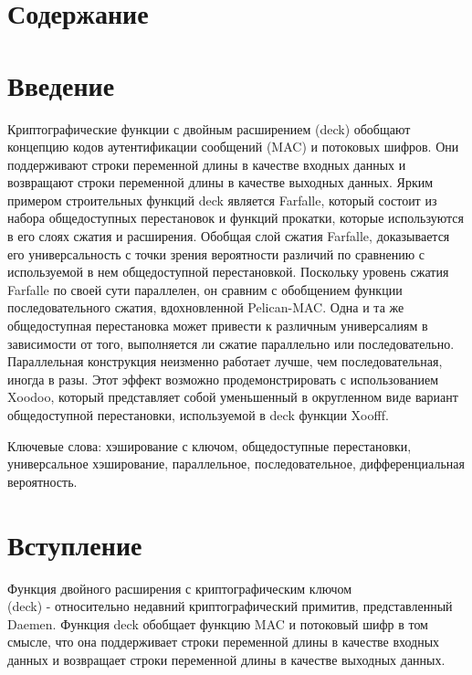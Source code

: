 \documentclass[utf8,14pt,a4paper,oneside,russian]{book}
\makeatletter
\renewcommand{\tableofcontents}{\section*{Содержание}\markboth{Содержание}{}\@starttoc{toc}\newpage}
\makeatother
\begin{document}
\tableofcontents

\newpage
\section{Введение}
Криптографические функции с двойным расширением (deck) обобщают концепцию 
кодов аутентификации сообщений (MAC) и потоковых шифров. Они поддерживают 
строки переменной длины в качестве входных данных и возвращают строки 
переменной длины в качестве выходных данных. Ярким примером строительных 
функций deck является Farfalle, который состоит из набора общедоступных 
перестановок и функций прокатки, которые используются в его слоях сжатия 
и расширения. Обобщая слой сжатия Farfalle, доказывается его универсальность 
с точки зрения вероятности различий по сравнению с используемой в нем общедоступной 
перестановкой. Поскольку уровень сжатия Farfalle по своей сути параллелен, 
он сравним с обобщением функции последовательного сжатия, вдохновленной 
Pelican-MAC. Одна и та же общедоступная перестановка может привести к 
различным универсалиям в зависимости от того, выполняется ли сжатие 
параллельно или последовательно. Параллельная конструкция неизменно работает 
лучше, чем последовательная, иногда в разы. Этот эффект возможно продемонстрировать с 
использованием Xoodoo, который представляет собой уменьшенный в округленном виде 
вариант общедоступной перестановки, используемой в deck функции Xoofff.

Ключевые слова: хэширование с ключом, общедоступные перестановки, 
универсальное хэширование, параллельное, последовательное, дифференциальная 
вероятность.



\newpage
\section{Вступление}


Функция двойного расширения с криптографическим ключом \\
(deck) - относительно недавний криптографический примитив, представленный 
Daemen. Функция deck обобщает функцию MAC и потоковый шифр в том смысле, 
что она поддерживает строки переменной длины в качестве входных данных и 
возвращает строки переменной длины в качестве выходных данных.
\end{document}
